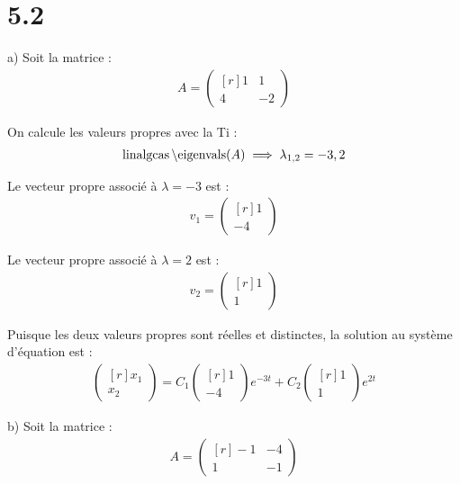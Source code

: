 \section*{5.2}

a) Soit la matrice :
\begin{align*}
    A =
    \begin{pmatrix*}[r]
	1&1\\
	4&-2
    \end{pmatrix*}
\end{align*}

On calcule les valeurs propres avec la Ti :
\begin{align*}
    \operatorname{linalgcas}\operatorname{\text{\textbackslash}eigenvals}(A)\implies\lambda_{1,2} = -3,2
\end{align*}

Le vecteur propre associé à $\lambda = -3$ est :
\begin{align*}
    v_1 = \begin{pmatrix*}[r]
    	1\\-4
    \end{pmatrix*}
\end{align*}

Le vecteur propre associé à $\lambda = 2$ est :
\begin{align*}
    v_2 = \begin{pmatrix*}[r]
    	1\\1
    \end{pmatrix*}
\end{align*}

Puisque les deux valeurs propres sont réelles et distinctes, 
la solution au système d'équation est :
\begin{align*}
    \begin{pmatrix*}[r]
        x_1\\x_2
    \end{pmatrix*}
    =
    C_1
    \begin{pmatrix*}[r]
        1\\-4
    \end{pmatrix*}
    e^{-3t}
    +C_2
    \begin{pmatrix*}[r]
        1\\1
    \end{pmatrix*}
    e^{2t}
\end{align*}

b) Soit la matrice :
\begin{align*}
    A =
    \begin{pmatrix*}[r]
	-1&-4\\
	1&-1
    \end{pmatrix*}
\end{align*}

